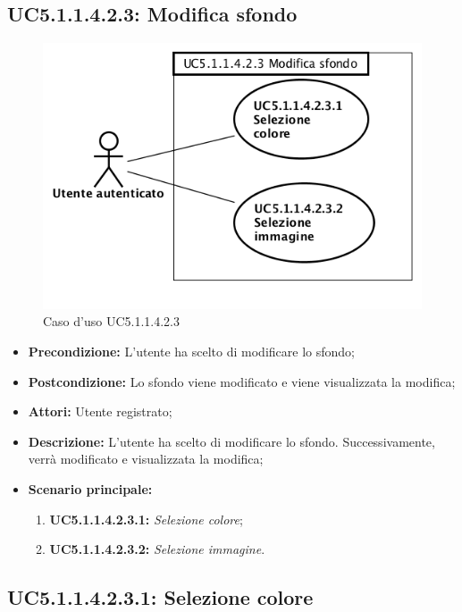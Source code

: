 \subsection{ UC5.1.1.4.2.3: Modifica sfondo}

\begin{figure}[h]
	\begin{center}
	\includegraphics[scale=0.6]{diagram/UC5-1-1-4-2-3.png}
	\caption{Caso d'uso UC5.1.1.4.2.3}
	\end{center}
\end{figure}
\begin{itemize}
	\item \textbf{Precondizione:} L'utente ha scelto di modificare lo sfondo;
	\item \textbf{Postcondizione:} Lo sfondo viene modificato e viene visualizzata la modifica;
	\item \textbf{Attori:} Utente registrato;
	\item \textbf{Descrizione:} L'utente ha scelto di modificare lo sfondo.  Successivamente, verrà modificato e visualizzata la modifica;
	\item \textbf{Scenario principale:}
	\begin{enumerate}
		\item \textbf{ UC5.1.1.4.2.3.1:} \textit{ Selezione colore};
		\item \textbf{ UC5.1.1.4.2.3.2:} \textit{ Selezione immagine}.
	\end{enumerate}
\end{itemize}
\subsection{ UC5.1.1.4.2.3.1: Selezione colore}

